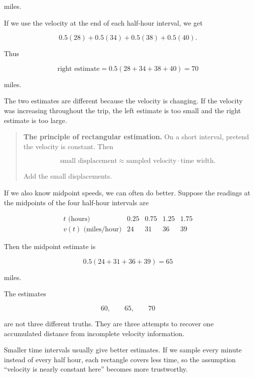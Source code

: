 miles.

If we use the velocity at the end of each half-hour interval, we get

\[
0.5(28)+0.5(34)+0.5(38)+0.5(40).
\]

Thus

\[
\text{right estimate}
=
0.5(28+34+38+40)
=
70
\]

miles.

The two estimates are different because the velocity is changing.  If the velocity was
increasing throughout the trip, the left estimate is too small and the right estimate is
too large.

\begin{quote}
\textbf{The principle of rectangular estimation.}
On a short interval, pretend the velocity is constant.  Then

\[
\text{small displacement}\approx \text{sampled velocity}\cdot \text{time width}.
\]

Add the small displacements.
\end{quote}

If we also know midpoint speeds, we can often do better.  Suppose the readings at the
midpoints of the four half-hour intervals are

\[
\begin{array}{c|cccc}
t\text{ (hours)} & 0.25 & 0.75 & 1.25 & 1.75 \\ \hline
v(t)\text{ (miles/hour)} & 24 & 31 & 36 & 39
\end{array}
\]

Then the midpoint estimate is

\[
0.5(24+31+36+39)=65
\]

miles.

The estimates

\[
60,\qquad 65,\qquad 70
\]

are not three different truths.  They are three attempts to recover one accumulated
distance from incomplete velocity information.

Smaller time intervals usually give better estimates.  If we sample every minute
instead of every half hour, each rectangle covers less time, so the assumption
``velocity is nearly constant here'' becomes more trustworthy.

